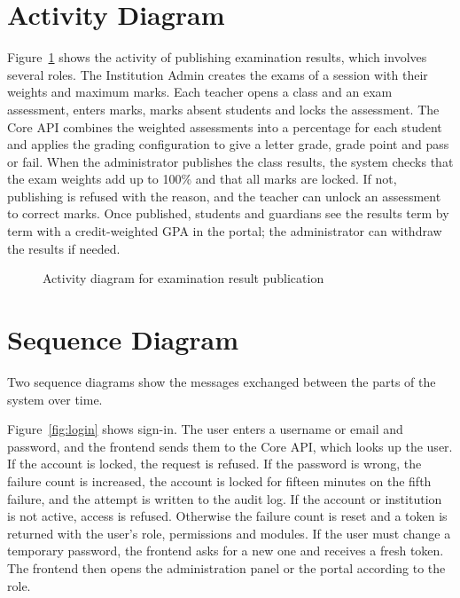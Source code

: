 \section{Activity Diagram}
Figure~\ref{fig:activity} shows the activity of publishing examination results, which involves several roles. The Institution Admin creates the exams of a session with their weights and maximum marks. Each teacher opens a class and an exam assessment, enters marks, marks absent students and locks the assessment. The Core API combines the weighted assessments into a percentage for each student and applies the grading configuration to give a letter grade, grade point and pass or fail. When the administrator publishes the class results, the system checks that the exam weights add up to 100\% and that all marks are locked. If not, publishing is refused with the reason, and the teacher can unlock an assessment to correct marks. Once published, students and guardians see the results term by term with a credit-weighted GPA in the portal; the administrator can withdraw the results if needed.

{
  \begin{figure}[!htbp]
    \centering
    \caption{Activity diagram for examination result publication}
    \label{fig:activity}
  \end{figure}
}

\section{Sequence Diagram}
Two sequence diagrams show the messages exchanged between the parts of the system over time.

Figure~\ref{fig:login} shows sign-in. The user enters a username or email and password, and the frontend sends them to the Core API, which looks up the user. If the account is locked, the request is refused. If the password is wrong, the failure count is increased, the account is locked for fifteen minutes on the fifth failure, and the attempt is written to the audit log. If the account or institution is not active, access is refused. Otherwise the failure count is reset and a token is returned with the user's role, permissions and modules. If the user must change a temporary password, the frontend asks for a new one and receives a fresh token. The frontend then opens the administration panel or the portal according to the role.

